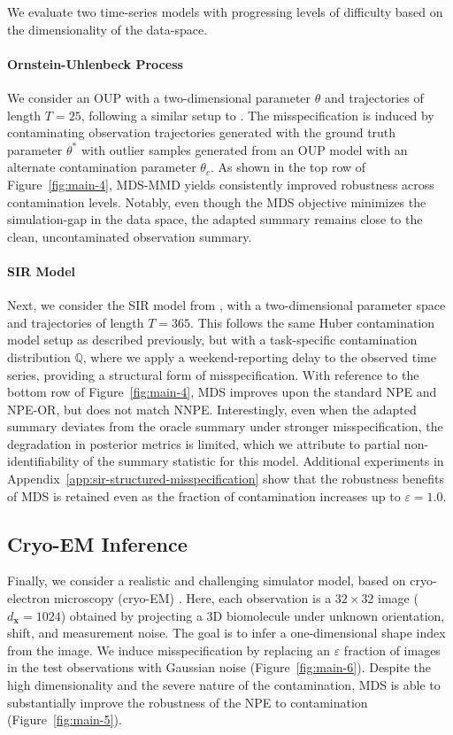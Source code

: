 \documentclass{article}
\theoremstyle{plain}
\theoremstyle{definition}
\theoremstyle{remark}
\begin{document}
We evaluate two time-series models with progressing levels of difficulty based on the dimensionality of the data-space. 

\paragraph{Ornstein-Uhlenbeck Process} We consider an OUP with a two-dimensional parameter $\theta$ and trajectories of length $T=25$, following a similar setup to \citet{huangLearningRobustStatistics2023g}. The misspecification is induced by contaminating observation trajectories generated with the ground truth parameter \( \theta^* \) with outlier samples generated from an OUP model with an alternate contamination parameter \( \theta_c \). As shown in the top row of Figure~\ref{fig:main-4}, MDS-MMD yields consistently improved robustness across contamination levels. Notably, even though the MDS objective minimizes the simulation-gap in the data space, the adapted summary remains close to the clean, uncontaminated observation summary.

\paragraph{SIR Model} Next, we consider the SIR model from \citet{wardRobustNeuralPosterior2022a}, with a two-dimensional parameter space and trajectories of length $T=365$. This follows the same Huber contamination model setup as described previously, but with a task-specific contamination distribution $\mathbb{Q}$,  where we apply a weekend-reporting delay to the observed time series, providing a structural form of misspecification. With reference to the bottom row of Figure~\ref{fig:main-4}, MDS improves upon the standard NPE and NPE-OR, but does not match NNPE. Interestingly, even when the adapted summary deviates from the oracle summary under stronger misspecification, the degradation in posterior metrics is limited, which we attribute to partial non-identifiability of the summary statistic for this model. Additional experiments in Appendix~\ref{app:sir-structured-misspecification} show that the robustness benefits of MDS is retained even as the fraction of contamination increases up to $\varepsilon = 1.0$.

\subsection{Cryo-EM Inference}
\label{exp:cryo-em}

Finally, we consider a realistic and challenging simulator model, based on cryo-electron microscopy (cryo-EM) \citep{dingeldeinAmortizedTemplateMatching2025}. Here, each observation is a $32\times 32$ image ($d_\mathbf{x}=1024$) obtained by projecting a 3D biomolecule under unknown orientation, shift, and measurement noise. The goal is to infer a one-dimensional shape index from the image. We induce misspecification by replacing an $\varepsilon$ fraction of images in the test observations with Gaussian noise (Figure~\ref{fig:main-6}).
Despite the high dimensionality and the severe nature of the contamination, MDS is able to substantially improve the robustness of the NPE to contamination (Figure~\ref{fig:main-5}).
\end{document}

